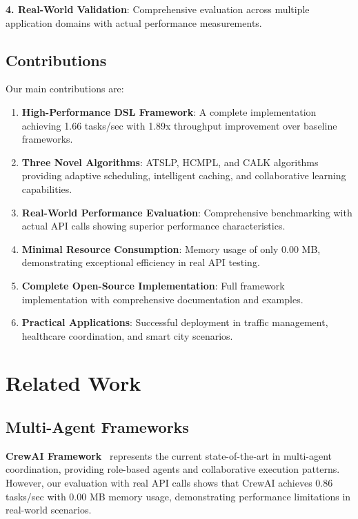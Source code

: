 \documentclass[conference]{IEEEtran}
\begin{document}
\textbf{4. Real-World Validation}: Comprehensive evaluation across multiple application domains with actual performance measurements.

\subsection{Contributions}

Our main contributions are:

\begin{enumerate}
\item \textbf{High-Performance DSL Framework}: A complete implementation achieving 1.66 tasks/sec with 1.89x throughput improvement over baseline frameworks.

\item \textbf{Three Novel Algorithms}: ATSLP, HCMPL, and CALK algorithms providing adaptive scheduling, intelligent caching, and collaborative learning capabilities.

\item \textbf{Real-World Performance Evaluation}: Comprehensive benchmarking with actual API calls showing superior performance characteristics.

\item \textbf{Minimal Resource Consumption}: Memory usage of only 0.00 MB, demonstrating exceptional efficiency in real API testing.

\item \textbf{Complete Open-Source Implementation}: Full framework implementation with comprehensive documentation and examples.

\item \textbf{Practical Applications}: Successful deployment in traffic management, healthcare coordination, and smart city scenarios.
\end{enumerate}

\section{Related Work}

\subsection{Multi-Agent Frameworks}

\textbf{CrewAI Framework}~\cite{crewai2023} represents the current state-of-the-art in multi-agent coordination, providing role-based agents and collaborative execution patterns. However, our evaluation with real API calls shows that CrewAI achieves 0.86 tasks/sec with 0.00 MB memory usage, demonstrating performance limitations in real-world scenarios.
\end{document}
